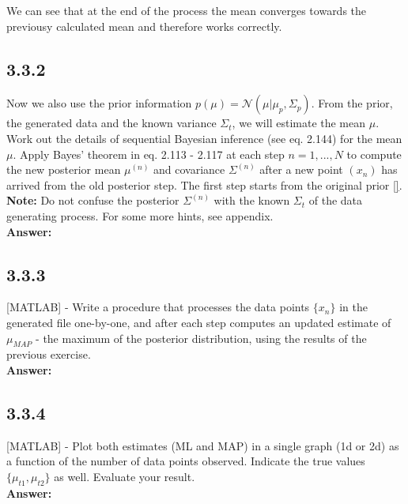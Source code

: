 \documentclass[a4paper]{article}
\begin{document}
We can see that at the end of the process the mean converges towards the previousy calculated mean and therefore works correctly.

\subsection*{3.3.2}


Now we also use the prior information $p(\mu) = \mathcal{N}(\mu | \mu_p, \Sigma_p)$. From the prior, the generated data and the known variance $\Sigma_t$, we will estimate the mean $\mu$.\\

Work out the details of sequential Bayesian inference (see eq. 2.144) for the mean $\mu$. Apply Bayes' theorem in eq. 2.113 - 2.117 at each step $n = 1, ..., N$ to compute the new posterior mean $\mu^{(n)}$ and covariance $\Sigma^{(n)}$ after a new point $(x_n)$ has arrived from the old posterior step. The first step starts from the original prior \ref{}.\\
\textbf{Note:} Do not confuse the posterior $\Sigma^{(n)}$ with the known $\Sigma_t$ of the data generating process. For some more hints, see appendix.\\

\textbf{Answer:}\\


\subsection*{3.3.3}

[MATLAB] - Write a procedure that processes the data points $\{ x_n\}$ in the generated file one-by-one, and after each step computes an updated estimate of $\mu_{MAP}$ - the maximum of the posterior distribution, using the results of the previous exercise.\\


\textbf{Answer:}\\


\subsection*{3.3.4}

[MATLAB] - Plot both estimates (ML and MAP) in a single graph (1d or 2d) as a function of the number of data points observed. Indicate the true values $\{ \mu_{t1}, \mu_{t2}\}$ as well. Evaluate your result.\\

\textbf{Answer:}\\
\end{document}
